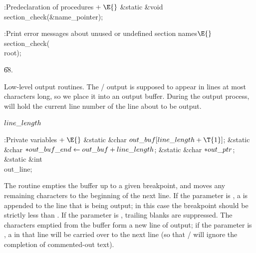 \B{}:Predeclaration of procedures\X${}\mathrel+\E{}$\5
\&{static} \&{void} \\{section\_check}(\&{name\_pointer});\par
\fi

\B{}:Print error messages about unused or undefined section names\X${}%
\E{}$\6
\\{section\_check}(\\{root});\par
\U68.\fi

Low-level output routines.
The \TEX/ output is supposed to appear in lines at most 
characters long, so we place it into an output buffer. During the output
process,  will hold the current line number of the line about
to
be output.

\Y\B\4\D$\\{line\_length}$ \5
\par
\Y\B\4:Private variables\X${}\mathrel+\E{}$\6
\&{static} \&{char} ${}\\{out\_buf}[\\{line\_length}+\T{1}]{}$;\6
\&{static} \&{char} ${}{*}\\{out\_buf\_end}\leftarrow\\{out\_buf}+\\{line\_length}{}$;%
\6
\&{static} \&{char} ${}{*}\\{out\_ptr}{}$;\6
\&{static} \&{int} \\{out\_line};\par
\fi

The  routine empties the buffer up to a given
breakpoint,
and moves any remaining characters to the beginning of the next line.
If the  parameter is , a  is
appended to the line
that is being output; in this case the breakpoint  should be strictly
less than . If the  parameter is ,
trailing blanks are suppressed.
The characters emptied from the buffer form a new line of output;
if the  parameter is , a  in that
line will be
carried over to the next line (so that \TEX/ will ignore the completion
of commented-out text).

